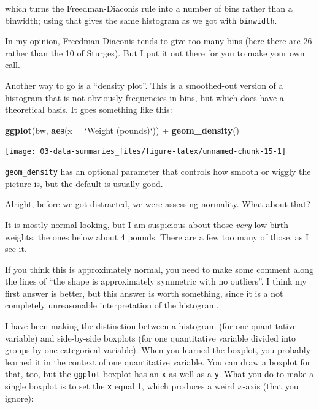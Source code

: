 \documentclass[]{tufte-book}
\newenvironment{Shaded}{}{}
\newcommand{\DataTypeTok}[1]{\textcolor[rgb]{0.56,0.13,0.00}{#1}}
\newcommand{\KeywordTok}[1]{\textcolor[rgb]{0.00,0.44,0.13}{\textbf{#1}}}
\newcommand{\NormalTok}[1]{#1}
\newcommand{\OperatorTok}[1]{\textcolor[rgb]{0.40,0.40,0.40}{#1}}
\newcommand{\StringTok}[1]{\textcolor[rgb]{0.25,0.44,0.63}{#1}}
\theoremstyle{definition}
\theoremstyle{definition}
\theoremstyle{definition}
\theoremstyle{remark}
\begin{document}
which turns the Freedman-Diaconis rule into a number of bins rather than
a binwidth; using that gives the same histogram as we got with
\texttt{binwidth}.

In my opinion, Freedman-Diaconis tends to give too many bins (here there
are 26 rather than the 10 of Sturges). But I put it out there for you to
make your own call.

Another way to go is a ``density plot''. This is a smoothed-out version
of a histogram that is not obviously frequencies in bins, but which does
have a theoretical basis. It goes something like this:

\begin{Shaded}
\begin{Highlighting}[]
\KeywordTok{ggplot}\NormalTok{(bw, }\KeywordTok{aes}\NormalTok{(}\DataTypeTok{x =} \StringTok{`}\DataTypeTok{Weight (pounds)}\StringTok{`}\NormalTok{)) }\OperatorTok{+}\StringTok{ }\KeywordTok{geom_density}\NormalTok{()}
\end{Highlighting}
\end{Shaded}

\texttt{[image: 03-data-summaries\_files/figure-latex/unnamed-chunk-15-1]}

\texttt{geom\_density} has an optional parameter that controls how
smooth or wiggly the picture is, but the default is usually good.

Alright, before we got distracted, we were assessing normality. What
about that?

It is mostly normal-looking, but I am suspicious about those \emph{very}
low birth weights, the ones below about 4 pounds. There are a few too
many of those, as I see it.

If you think this is approximately normal, you need to make some comment
along the lines of ``the shape is approximately symmetric with no
outliers''. I think my first answer is better, but this answer is worth
something, since it is a not completely unreasonable interpretation of
the histogram.

I have been making the distinction between a histogram (for one
quantitative variable) and side-by-side boxplots (for one quantitative
variable divided into groups by one categorical variable). When you
learned the boxplot, you probably learned it in the context of one
quantitative variable. You can draw a boxplot for that, too, but the
\texttt{ggplot} boxplot has an \texttt{x} as well as a \texttt{y}. What
you do to make a single boxplot is to set the \texttt{x} equal 1, which
produces a weird \(x\)-axis (that you ignore):
\end{document}
